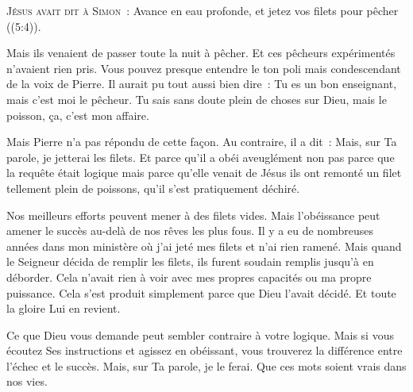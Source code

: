 



\lettrine{J}{ésus avait dit à Simon~:}
 \og Avance en eau profonde, et jetez vos filets pour pêcher \fg{}
 ((5:4)).

Mais ils venaient de passer toute la nuit à pêcher.
 Et ces pêcheurs expérimentés n'avaient rien pris.
 Vous pouvez presque entendre le ton poli mais condescendant
 de la voix de Pierre. Il aurait pu tout aussi bien dire~: 
 \og Tu es un bon enseignant, mais c'est moi le pêcheur.
 Tu sais sans doute plein de choses sur Dieu, mais le poisson,
 ça, c'est mon affaire. \fg{}


Mais Pierre n'a pas répondu de cette façon.
 Au contraire, il a dit~: 
 \og Mais, sur Ta parole, je jetterai les filets. \fg{}
 Et parce qu'il a obéi aveuglément \ocadr non pas parce que la requête était
 logique mais parce qu'elle venait de Jésus \fcadr{}
 ils ont remonté un filet tellement plein de poissons,
 qu'il s'est pratiquement déchiré.

Nos meilleurs efforts peuvent mener à des filets vides.
 Mais l'obéissance peut amener le succès au-delà de nos rêves les plus fous.
 Il y a eu de nombreuses années dans mon ministère où j'ai jeté mes filets
 et n'ai rien ramené. Mais quand le Seigneur décida de remplir les filets,
 ils furent soudain remplis jusqu'à en déborder.
 Cela n'avait rien à voir avec mes propres capacités ou ma propre puissance.
 Cela s'est produit simplement parce que Dieu l'avait décidé.
 Et toute la gloire Lui en revient.

Ce que Dieu vous demande peut sembler contraire à votre logique.
 Mais si vous écoutez Ses instructions et agissez en obéissant,
 vous trouverez la différence entre l'échec et le succès.
 \og Mais, sur Ta parole, je le ferai. \fg{}
 Que ces mots soient vrais dans nos vies.

\dvrule



